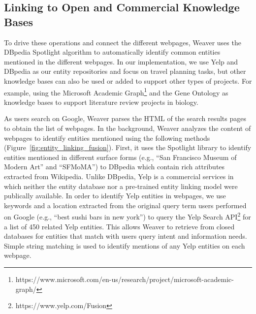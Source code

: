 \subsection{Linking to Open and Commercial Knowledge Bases}

To drive these operations and connect the different webpages, Weaver uses the DBpedia Spotlight algorithm \cite{spotlight} to automatically identify common entities mentioned in the different webpages. In our implementation, we use Yelp and DBpedia as our entity repositories and focus on travel planning tasks, but other knowledge bases can also be used or added to support other types of projects. For example, using the Microsoft Academic Graph\footnote{https://www.microsoft.com/en-us/research/project/microsoft-academic-graph/} and the Gene Ontology \cite{gene} as knowledge bases to support literature review projects in biology.

As users search on Google, Weaver parses the HTML of the search results pages to obtain the list of webpages. In the background, Weaver analyzes the content of webpages to identify entities mentioned using the following methods (Figure~\ref{fig:entity_linking_fusion}). First, it uses the Spotlight library \cite{spotlight} to identify entities mentioned in different surface forms (e.g., ``San Francisco Museum of Modern Art'' and ``SFMoMA'') to DBpedia which contain rich attributes extracted from Wikipedia. Unlike DBpedia, Yelp is a commercial services in which neither the entity database nor a pre-trained entity linking model were publically available. In order to identify Yelp entities in webpages, we use keywords and a location extracted from the original query term users performed on Google (e.g., ``best sushi bars in new york'') to query the Yelp Search API\footnote{https://www.yelp.com/Fusion} for a list of 450 related Yelp entities. This allows Weaver to retrieve from closed databases for entities that match with users query intent and information needs. Simple string matching is used to identify mentions of any Yelp entities on each webpage.


